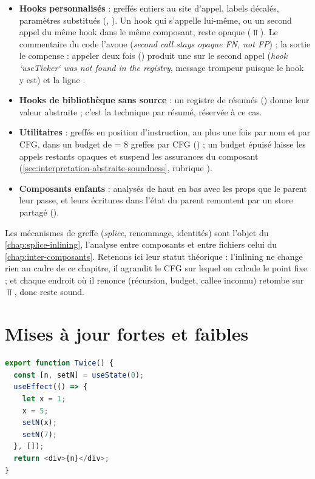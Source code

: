 \begin{itemize}
  \item \textbf{Hooks personnalisés} : greffés entiers au site d'appel, labels
    décalés, paramètres substitués (,
    ). Un hook qui s'appelle lui-même,
    ou un second appel du même hook dans le même composant, reste opaque
    ($\Top$). Le commentaire du code l'avoue (\og \emph{second call stays opaque
    FN, not FP}\fg{}) ; la sortie le compense : appeler  deux
    fois () produit une \Info{}
     sur le second appel (\og \emph{hook `useTicker` was
    not found in the registry}\fg{}, message trompeur puisque le hook y est) et
    la ligne .
  \item \textbf{Hooks de bibliothèque sans source} : un registre de résumés
    () donne leur valeur abstraite ; c'est la technique
    par résumé, réservée à ce cas.
  \item \textbf{Utilitaires} : greffés en position d'instruction, au plus une
    fois par nom et par CFG, dans un budget de  = 8
    greffes par CFG () ; un budget
    épuisé laisse les appels restants opaques et suspend les assurances du
    composant (\cref{sec:interpretation-abstraite-soundness}, rubrique \Info).
  \item \textbf{Composants enfants} : analysés de haut en bas avec les props
    que le parent leur passe, et leurs écritures dans l'état du parent
    remontent par un store partagé ().
\end{itemize}

Les mécanismes de greffe (\emph{splice}, renommage, identités) sont l'objet du
\cref{chap:splice-inlining}, l'analyse entre composants et entre fichiers
celui du \cref{chap:inter-composants}. Retenons ici leur statut théorique :
l'inlining ne change rien au cadre de ce chapitre, il agrandit le CFG sur
lequel on calcule le point fixe ; et chaque endroit où il renonce (récursion,
budget, callee inconnu) retombe sur $\Top$, donc reste sound.

\section{Mises à jour fortes et faibles}
\label{sec:interpretation-abstraite-mises-a-jour}

\begin{lstlisting}[language=TypeScript,caption={Deux écritures successives (\file{/tmp/ch03/weak.tsx}, élagué de sa ligne d'import)},label={lst:interpretation-abstraite-weak}]
export function Twice() {
  const [n, setN] = useState(0);
  useEffect(() => {
    let x = 1;
    x = 5;
    setN(x);
    setN(7);
  }, []);
  return <div>{n}</div>;
}
\end{lstlisting}

